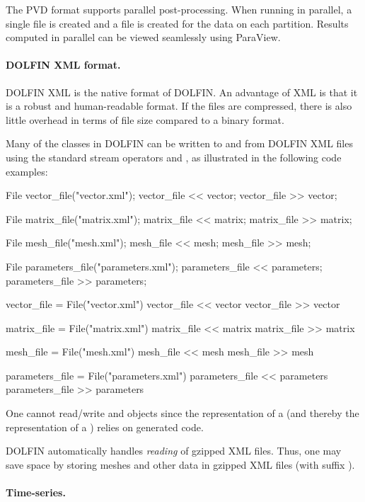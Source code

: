 The PVD format supports parallel post-processing. When running in
parallel, a single  file is created and a  file is
created for the data on each partition. Results computed in parallel
can be viewed seamlessly using ParaView.


\paragraph{DOLFIN XML format.}

DOLFIN XML is the native format of DOLFIN. An advantage of XML is that
it is a robust and human-readable format. If the files are compressed,
there is also little overhead in terms of file size compared to a
binary format.

Many of the classes in DOLFIN can be written to and from DOLFIN XML
files using the standard stream operators \emp{<{}<} and \emp{>{}>}, as
illustrated in the following code examples:
\begin{c++}
File vector_file("vector.xml");
vector_file << vector;
vector_file >> vector;

File matrix_file("matrix.xml");
matrix_file << matrix;
matrix_file >> matrix;

File mesh_file("mesh.xml");
mesh_file << mesh;
mesh_file >> mesh;

File parameters_file("parameters.xml");
parameters_file << parameters;
parameters_file >> parameters;
\end{c++}
\begin{python}
vector_file = File("vector.xml")
vector_file << vector
vector_file >> vector

matrix_file = File("matrix.xml")
matrix_file << matrix
matrix_file >> matrix

mesh_file = File("mesh.xml")
mesh_file << mesh
mesh_file >> mesh

parameters_file = File("parameters.xml")
parameters_file << parameters
parameters_file >> parameters
\end{python}
One cannot read/write  and  objects
since the representation of a  (and thereby the
representation of a ) relies on generated code.

DOLFIN automatically handles \emph{reading} of gzipped XML files. Thus,
one may save space by storing meshes and other data in gzipped XML files
(with suffix ).


\paragraph{Time-series.}

